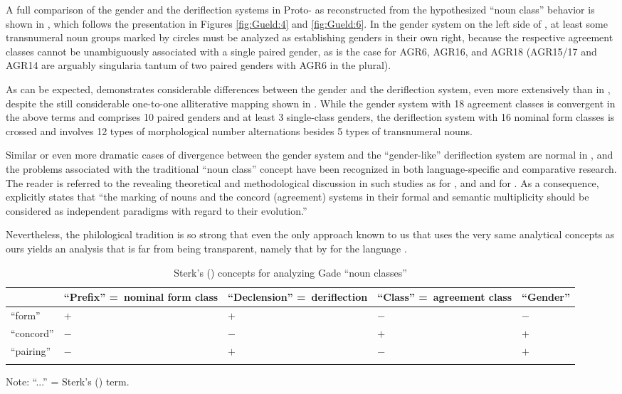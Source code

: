 \documentclass[output=collectionpaper]{langsci/langscibook}
\begin{document}
A full comparison of the gender and the deriflection systems in Proto- as reconstructed from the hypothesized ``noun class'' behavior is shown in , which follows the presentation in Figures \ref{fig:Gueld:4} and \ref{fig:Gueld:6}. In the gender system on the left side of , at least some transnumeral noun groups marked by circles must be analyzed as establishing genders in their own right, because the respective agreement classes cannot be unambiguously associated with a single paired gender, as is the case for AGR6, AGR16, and AGR18 (AGR15/17 and AGR14 are arguably singularia tantum of two paired genders with AGR6 in the plural).

As can be expected,  demonstrates considerable differences between the gender and the deriflection system, even more extensively than in , despite the still considerable one-to-one alliterative mapping shown in . While the gender system with 18 agreement classes is convergent in the above terms and comprises 10 paired genders and at least 3 single-class genders, the deriflection system with 16 nominal form classes is crossed and involves 12 types of morphological number alternations besides 5 types of transnumeral nouns.


Similar or even more dramatic cases of divergence between the gender system and the ``gender-like'' deriflection system are normal in , and the problems associated with the traditional ``noun class'' concept have been recognized in both language-specific and comparative research. The reader is referred to the revealing theoretical and methodological discussion in such studies as \citet{Guthrie1948} for , and \citet{Voorhoeve1969} and \citet{DeWolf1971} for . As a consequence, \citet[33f]{Mieheforthcoming} explicitly states that ``the marking of nouns and the concord (agreement) systems in their formal and semantic multiplicity should be considered as independent paradigms with regard to their evolution.''

Nevertheless, the philological tradition is so strong that even the only approach known to us that uses the very same analytical concepts as ours yields an analysis that is far from being transparent, namely that by \citet{Sterk1978} for the  language .

\begin{table}[!htb]
\begin{tabularx}{\textwidth}{XQXQX}
\lsptoprule
& ``Prefix'' =~nominal form class & ``Declension'' =~deriflection & ``Class'' =~agreement class & ``Gender''\\
\midrule
``form'' & $+$ & $+$ & $-$ & $-$\\
``concord'' & $-$ & $-$ & $+$ & $+$\\
``pairing'' & $-$ & $+$ & $-$ & $+$\\
\lspbottomrule
\end{tabularx}
{\small Note: ``...'' = Sterk's (\citeyear{Sterk1978}) term.}

\caption{Sterk's (\citeyear[25]{Sterk1978}) concepts for analyzing Gade ``noun classes''}
\label{tab:Gueld:3}
\end{table}
\end{document}
